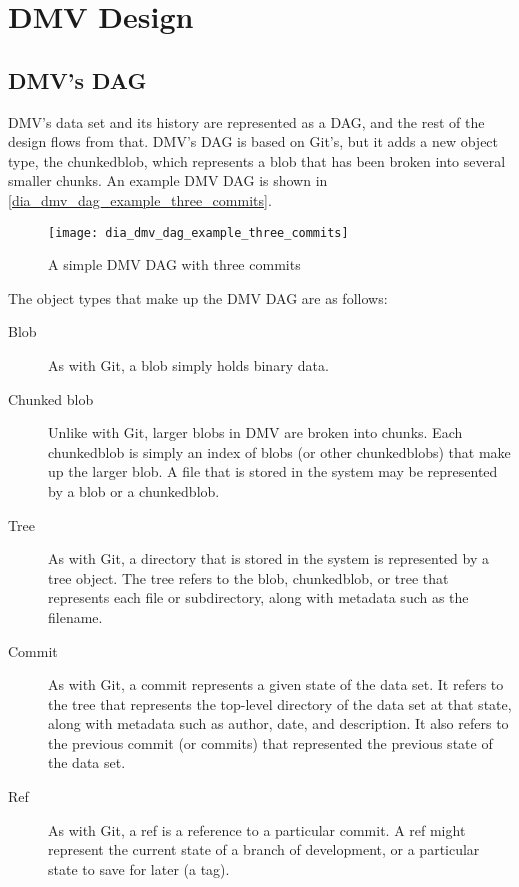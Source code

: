 \chapter{DMV Design}


\section{DMV's DAG}

\gls{DMV}'s data set and its history are represented as a \gls{DAG}, and the
rest of the design flows from that. \gls{DMV}'s \gls{DAG} is based on Git's, but
it adds a new object type, the \gls{chunkedblob}, which represents a \gls{blob}
that has been broken into several smaller chunks. An example \gls{DMV} \gls{DAG}
is shown in \autoref{dia_dmv_dag_example_three_commits}.

\begin{figure}[]
    \centering
    \texttt{[image: dia\_dmv\_dag\_example\_three\_commits]}
    \caption{A simple DMV DAG with three commits}
    \label{dia_dmv_dag_example_three_commits}
\end{figure}

The object types that make up the \gls{DMV} \gls{DAG} are as follows:

\begin{description}

    \item[Blob] As with Git, a \gls{blob} simply holds binary data.

    \item[Chunked blob] Unlike with Git, larger \glspl{blob} in \gls{DMV} are
        broken into chunks. Each \gls{chunkedblob} is simply an index of
        \glspl{blob} (or other \glspl{chunkedblob}) that make up the larger
        \gls{blob}. A file that is stored in the system may be represented by a
        \gls{blob} or a \gls{chunkedblob}.

    \item[Tree] As with Git, a directory that is stored in the system is
        represented by a \gls{tree} object. The \gls{tree} refers to the
        \gls{blob}, \gls{chunkedblob}, or \gls{tree} that represents each file
        or subdirectory, along with metadata such as the filename.

    \item[Commit] As with Git, a \gls{commit} represents a given state of the
        data set. It refers to the \gls{tree} that represents the top-level
        directory of the data set at that state, along with metadata such as
        author, date, and description. It also refers to the previous
        \gls{commit} (or \glspl{commit}) that represented the previous state of
        the data set.

    \item[Ref] As with Git, a ref is a reference to a particular \gls{commit}. A
        ref might represent the current state of a branch of development, or a
        particular state to save for later (a tag).

\end{description}

